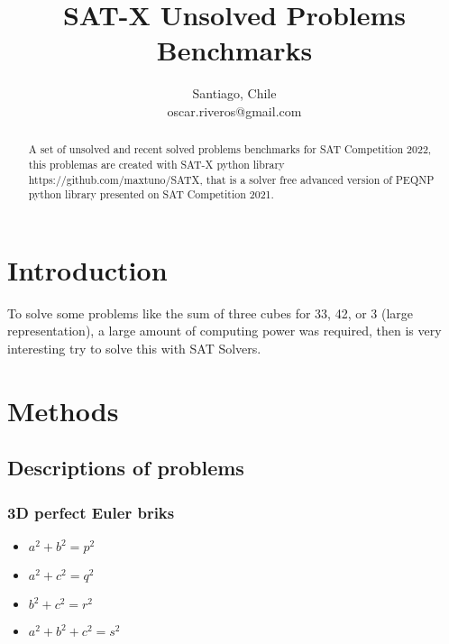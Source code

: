 \documentclass[conference]{IEEEtran}
\begin{document}
    \title{SAT-X Unsolved Problems Benchmarks\\
    }

    \author{
    Santiago, Chile \\
    oscar.riveros@gmail.com
    }

    \maketitle

    \begin{abstract}
        A set of unsolved and recent solved problems benchmarks for SAT Competition 2022, this problemas are created with SAT-X python library https://github.com/maxtuno/SATX, that is a solver free advanced version of PEQNP python library presented on SAT Competition 2021\cite{b1}.
    \end{abstract}


    \section{Introduction}
    To solve some problems like the sum of three cubes for 33, 42, or 3 (large representation), a large amount of computing power was required, then is very interesting try to solve this with SAT Solvers.


    \section{Methods}

    \subsection{Descriptions of problems}

    \subsubsection{3D perfect Euler briks}

    \begin{itemize}
        \item $a^2 + b^2 = p^2$
        \item $a^2 + c^2 = q^2$
        \item $b^2 + c^2 = r^2$
        \item $a^2 + b^2 + c^2 = s^2$
    \end{itemize}
\end{document}
